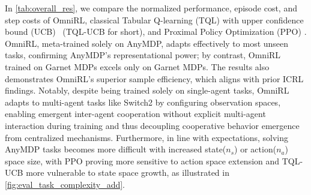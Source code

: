 \documentclass{article}
\renewcommand{\cite}[1]{\citep{#1}}
\begin{document}
In \cref{tab:overall_res}, we compare the normalized performance, episode cost, and step costs of OmniRL, classical Tabular Q-learning (TQL) \cite{sutton1998reinforcement} with upper confidence bound (UCB)~\cite{jin2018q} (TQL-UCB for short), and Proximal Policy Optimization (PPO) \citep{schulman2017proximal}. OmniRL, meta-trained solely on AnyMDP, adapts effectively to most unseen tasks, confirming AnyMDP’s representational power; by contrast, OmniRL trained on Garnet MDPs excels only on Garnet MDPs. The results also demonstrates OmniRL's superior sample efficiency, which aligns with prior ICRL findings. Notably, despite being trained solely on single-agent tasks, OmniRL adapts to multi-agent tasks like Switch2 by configuring observation spaces, enabling emergent inter-agent cooperation without explicit multi-agent interaction during training and thus decoupling cooperative behavior emergence from centralized mechanisms. Furthermore, in line with expectations, solving AnyMDP tasks becomes more difficult with increased state($n_s$) or action($n_a$) space size, with PPO proving more sensitive to action space extension and TQL-UCB more vulnerable to state space growth, as illustrated in \cref{fig:eval_task_complexity_add}.
\end{document}
